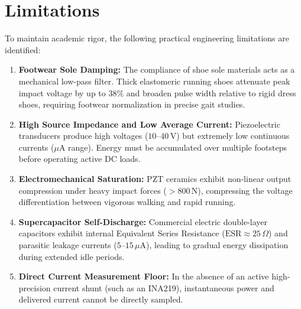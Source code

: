 \section{Limitations}
To maintain academic rigor, the following practical engineering limitations are identified:
\begin{enumerate}[itemsep=2pt,parsep=1pt,topsep=3pt]
    \item \textbf{Footwear Sole Damping:} The compliance of shoe sole materials acts as a mechanical low-pass filter. Thick elastomeric running shoes attenuate peak impact voltage by up to $38\%$ and broaden pulse width relative to rigid dress shoes, requiring footwear normalization in precise gait studies.
    \item \textbf{High Source Impedance and Low Average Current:} Piezoelectric transducers produce high voltages ($10\text{--}40\,\text{V}$) but extremely low continuous currents ($\mu\text{A}$ range). Energy must be accumulated over multiple footsteps before operating active DC loads.
    \item \textbf{Electromechanical Saturation:} PZT ceramics exhibit non-linear output compression under heavy impact forces ($>800\,\text{N}$), compressing the voltage differentiation between vigorous walking and rapid running.
    \item \textbf{Supercapacitor Self-Discharge:} Commercial electric double-layer capacitors exhibit internal Equivalent Series Resistance ($\text{ESR} \approx 25\,\Omega$) and parasitic leakage currents ($5\text{--}15\,\mu\text{A}$), leading to gradual energy dissipation during extended idle periods.
    \item \textbf{Direct Current Measurement Floor:} In the absence of an active high-precision current shunt (such as an INA219), instantaneous power and delivered current cannot be directly sampled.
\end{enumerate}

